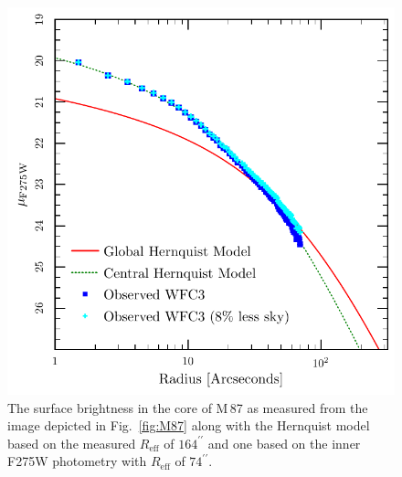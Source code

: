 \documentclass[useAMS,usenatbib]{mn2e}
\begin{document}
\begin{figure}
  \includegraphics[width=\columnwidth]{m87}
  \caption{The surface brightness in the core of M\,87 as measured
    from the image depicted in Fig.~\ref{fig:M87} along with the
    Hernquist model based on the measured $R_\mathrm{eff}$ of
    $164^{\prime\prime}$ and one based on the inner F275W photometry
    with $R_\mathrm{eff}$ of $74^{\prime\prime}$.}
  \label{fig:M87-iso}
\end{figure}

\end{document}
